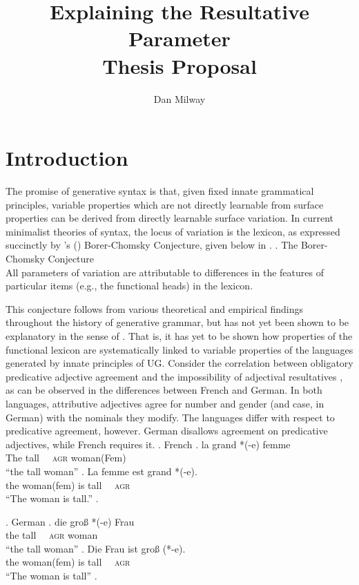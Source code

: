 \documentclass[letterpaper,12pt]{article}
\title{Explaining the Resultative Parameter\\{\large Thesis Proposal}}
\author{Dan Milway}
\begin{document}
\maketitle

\section{Introduction}
The promise of generative syntax is that, given fixed innate grammatical principles, variable properties which are not directly learnable from surface properties can be derived from directly learnable surface variation.
In current minimalist theories of syntax, the locus of variation is the lexicon, as expressed succinctly by \citeauthor{baker2008microparameter}'s (\citeyear{baker2008microparameter}) Borer-Chomsky Conjecture, given below in \Next.
\ex. The Borer-Chomsky Conjecture\\
All parameters of variation are attributable to differences in the features of particular items (e.g., the functional heads) in the lexicon. \hfill \parencite{baker2008microparameter}

This conjecture follows from various theoretical and empirical findings throughout the history of generative grammar, but has not yet been shown to be explanatory in the sense of \textcite{chomsky1965aspects}.
That is, it has yet to be shown how properties of the functional lexicon are systematically linked to variable properties of the languages generated by innate principles of UG.
Consider the correlation between obligatory predicative adjective agreement and the impossibility of adjectival resultatives \parencite{kratzer_building_2004}, as can be observed in the differences between French and German.
In both languages, attributive adjectives agree for number and gender (and case, in German) with the nominals they modify. 
The languages differ with respect to predicative agreement, however.
German disallows agreement on predicative adjectives, while French requires it.
\ex. French 
\ag. la grand *(-e) femme\\
The tall \textsc{~~agr} woman(Fem)\\
``the tall woman''
\bg. La femme est grand *(-e).\\
the woman(fem) is tall \textsc{~~agr}\\
``The woman is tall.''
\z.

\ex. German 
\ag. die gro\ss{} *(-e) Frau\\
the tall \textsc{~~agr} woman\\
``the tall woman''
\bg. Die Frau ist gro\ss{} (*-e).\\
the woman(fem) is tall \textsc{~~agr}\\
``The woman is tall''
\z.
\end{document}
